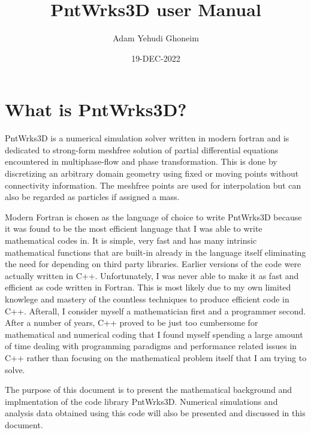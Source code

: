 \documentclass[12pt]{extarticle}
\begin{document}
\title{PntWrks3D user Manual}
\author{Adam Yehudi Ghoneim}
\renewcommand\Affilfont{\itshape\small}
\date{19-DEC-2022}
\maketitle

\section{What is PntWrks3D?}
PntWrks3D is a numerical simulation solver written in modern fortran and is dedicated to strong-form meshfree solution of partial differential equations encountered in multiphase-flow and phase transformation. This is done by discretizing an arbitrary domain geometry using fixed or moving points without connectivity information. The meshfree points are used for interpolation but can also be regarded as particles if assigned a mass.

\vspace{5 mm}
Modern Fortran is chosen as the language of choice to write PntWrks3D because it was found to be the most efficient language that I was able to write mathematical codes in. It is simple, very fast and has many intrinsic mathematical functions that are built-in already in the language itself eliminating the need for depending on third party libraries. Earlier versions of the code were actually written in C++. Unfortunately, I was never able to make it as fast and efficient as code written in Fortran. This is most likely due to my own limited knowlege and mastery of the countless techniques to produce efficient code in C++. Afterall, I consider myself a mathematician first and a programmer second. After a number of years, C++ proved to be just too cumbersome for mathematical and numerical coding that I found myself spending a large amount of time dealing with programming paradigms and performance related issues in C++ rather than focusing on the mathematical problem itself that I am trying to solve.

\vspace{5 mm}
The purpose of this document is to present the mathematical background and implmentation of the code library PntWrks3D. Numerical simulations and analysis data obtained using this code will also be presented and discussed in this document. 
\end{document}
